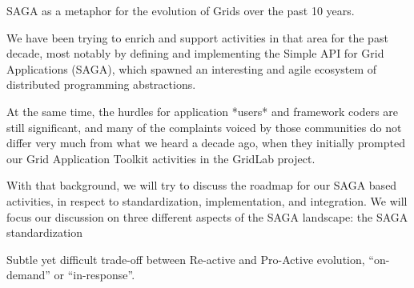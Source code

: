 \documentclass{article}
\newcommand{\I}[1]{\textit{#1}}
\newcommand{\B}[1]{\textbf{#1}}
\newcommand{\todo}[1]{{\textcolor{red}{\B{TODO:} #1 }}}
\newcommand{\jhanote}[1]{{\textcolor{red}{     \B{Shantenu:} #1 }}}
\newcommand{\jhanote}[1]{}
\begin{document}
SAGA as a metaphor for the evolution of Grids over the past 10 years.

We have been trying to enrich and support activities in that area for
the past decade, most notably by defining and implementing the Simple
API for Grid Applications (SAGA), which spawned an interesting and
agile ecosystem of distributed programming abstractions.

At the same time, the hurdles for application *users* and framework
coders are still significant, and many of the complaints voiced by
those communities do not differ very much from what we heard a decade
ago, when they initially prompted our Grid Application Toolkit
activities in the GridLab project.

With that background, we will try to discuss the roadmap for our SAGA
based activities, in respect to standardization, implementation, and
integration.  We will focus our discussion on three different aspects
of the SAGA landscape: the SAGA standardization

Subtle yet difficult trade-off between Re-active and Pro-Active
evolution, ``on-demand'' or ``in-response''.



  
\end{document}
